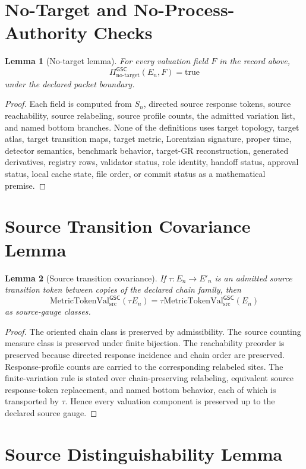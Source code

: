\documentclass[11pt]{article}
\newcommand{\MetricTokenVal}{\mathrm{MetricTokenVal}_{\mathrm{src}}^{\mathsf{GSC}}}
\newcommand{\NoTarget}{\Pi_{\mathrm{no\mbox{-}target}}^{\mathsf{GSC}}}
\newcommand{\En}{E_n}
\newtheorem{lemma}{Lemma}
\begin{document}
\section{No-Target and No-Process-Authority Checks}

\begin{lemma}[No-target lemma]
For every valuation field \(F\) in the record above,
\[
  \NoTarget(\En,F)=\mathrm{true}
\]
under the declared packet boundary.
\end{lemma}

\begin{proof}
Each field is computed from \(S_n\), directed source response tokens, source
reachability, source relabeling, source profile counts, the admitted
variation list, and named bottom branches. None of the definitions uses target
topology, target atlas, target transition maps, target metric, Lorentzian
signature, proper time, detector semantics, benchmark behavior, target-GR
reconstruction, generated derivatives, registry rows, validator status, role
identity, handoff status, approval status, local cache state, file order, or
commit status as a mathematical premise.
\end{proof}

\section{Source Transition Covariance Lemma}

\begin{lemma}[Source transition covariance]
If \(\tau:\En\to E'_n\) is an admitted source transition token between copies
of the declared chain family, then
\[
  \MetricTokenVal(\tau\En)=\tau\MetricTokenVal(\En)
\]
as source-gauge classes.
\end{lemma}

\begin{proof}
The oriented chain class is preserved by admissibility. The source counting
measure class is preserved under finite bijection. The reachability preorder
is preserved because directed response incidence and chain order are
preserved. Response-profile counts are carried to the corresponding relabeled
sites. The finite-variation rule is stated over chain-preserving relabeling,
equivalent source response-token replacement, and named bottom behavior, each
of which is transported by \(\tau\). Hence every valuation component is
preserved up to the declared source gauge.
\end{proof}

\section{Source Distinguishability Lemma}
\end{document}
